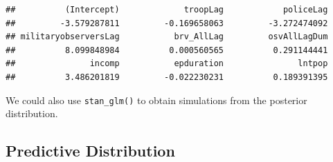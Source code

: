 \documentclass[
]{book}
\newenvironment{Shaded}{\begin{snugshade}}{\end{snugshade}}
\newcommand{\AttributeTok}[1]{\textcolor[rgb]{0.77,0.63,0.00}{#1}}
\newcommand{\ControlFlowTok}[1]{\textcolor[rgb]{0.13,0.29,0.53}{\textbf{#1}}}
\newcommand{\DecValTok}[1]{\textcolor[rgb]{0.00,0.00,0.81}{#1}}
\newcommand{\FunctionTok}[1]{\textcolor[rgb]{0.00,0.00,0.00}{#1}}
\newcommand{\NormalTok}[1]{#1}
\newcommand{\OtherTok}[1]{\textcolor[rgb]{0.56,0.35,0.01}{#1}}
\newcommand{\SpecialCharTok}[1]{\textcolor[rgb]{0.00,0.00,0.00}{#1}}
\newcommand{\StringTok}[1]{\textcolor[rgb]{0.31,0.60,0.02}{#1}}
\begin{document}
\begin{verbatim}
##          (Intercept)             troopLag            policeLag 
##         -3.579287811         -0.169658063         -3.272474092 
## militaryobserversLag           brv_AllLag         osvAllLagDum 
##          8.099848984          0.000560565          0.291144441 
##               incomp           epduration               lntpop 
##          3.486201819         -0.022230231          0.189391395
\end{verbatim}

We could also use \texttt{stan\_glm()} to obtain simulations from the
posterior distribution.

\hypertarget{predictive-distribution-1}{%
\subsection{Predictive Distribution}\label{predictive-distribution-1}}

\begin{Shaded}
\end{Shaded}
\end{document}
